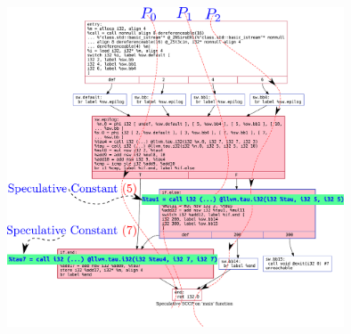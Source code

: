 \documentclass[aspectratio=169, compress]{beamer}
\begin{document}
\begin{frame}
	\centering
	\includegraphics[width=10.2cm, height=9.5cm]{dotfiles/specSCCP_HPSSA_next.dot.pdf}
\end{frame}
\end{document}
